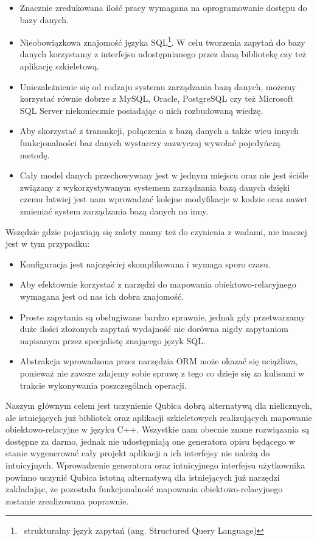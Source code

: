 \documentclass[12pt]{report}
\begin{document}
\begin{itemize}
\item Znacznie zredukowana ilość pracy wymagana na oprogramowanie dostępu do bazy danych.
\item Nieobowiązkowa znajomość języka SQL\footnote{~strukturalny język zapytań (ang. Structured Query Language)}. W celu tworzenia zapytań do bazy
danych korzystamy z interfejsu udostępnianego przez daną bibliotekę czy też aplikację szkieletową.
\item Uniezależnienie się od rodzaju systemu zarządzania bazą danych, możemy korzystać równie dobrze z MySQL, Oracle, PostgreSQL czy też Microsoft SQL Server
niekoniecznie posiadając o nich rozbudowaną wiedzę.
\item Aby skorzystać z transakcji, połączenia z bazą danych a także wieu innych funkcjonalności baz danych wystarczy zazwyczaj wywołać pojedyńczą me\-to\-dę.
\item Cały model danych przechowywany jest w jednym miejscu oraz nie jest ściśle związany z wykorzystywanym systemem zarządzania bazą danych dzięki cze\-mu łatwiej 
jest nam wprowadzać kolejne modyfikacje w kodzie oraz nawet zmieniać system zarządzania bazą danych na inny.
\end{itemize}

Wszędzie gdzie pojawiają się zalety mamy też do czynienia z wadami, nie inaczej jest w tym przypadku:

\begin{itemize}
\item Konfiguracja jest najczęściej skomplikowana i wymaga sporo czasu.
\item Aby efektownie korzystać z narzędzi do mapowania obiektowo-relacyjnego wymagana jest od nas ich dobra znajomość.
\item Proste zapytania są obsługiwane bardzo sprawnie, jednak gdy przetwarzamy duże ilości złożonych zapytań wydajność nie dorówna nigdy zapytaniom na\-pi\-sa\-nym
przez specjalistę znającego język SQL.
\item Abstrakcja wprowadzona przez narzędzia ORM może okazać się uciążliwa, ponieważ nie zawsze zdajemy sobie sprawę z tego co dzieje się za kulisami w trakcie
wykonywania poszczególnch operacji.
\end{itemize}

Naszym głównym celem jest uczynienie Qubica dobrą alternatywą dla nie\-li\-cznych, ale istniejących już bibliotek oraz aplikacji szkieletowych realizujących mapowanie 
obiektowo-relacyjne w języku C++. Wszystkie nam obecnie znane rozwiązania są dostępne za darmo, jednak nie udostępniają one generatora opisu będącego w stanie 
wygenerować cały projekt aplikacji a ich interfejsy nie należą do intuicyjnych. Wprowadzenie generatora oraz intuicyjnego interfejsu użytkownika powinno uczynić Qubica
istotną alternatywą dla istniejących już narzędzi za\-kła\-da\-jąc, że pozostała funkcjonalność mapowania obiektowo-relacyjnego zostanie zre\-al\-iz\-owana poprawnie.
\end{document}
